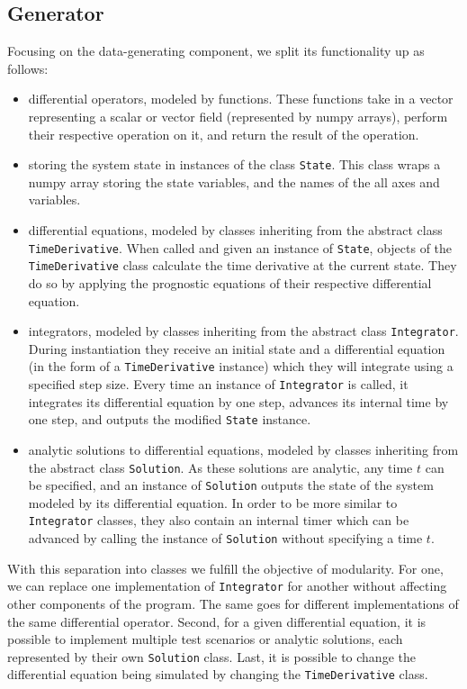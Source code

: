 \subsection*{Generator}
Focusing on the data-generating component, we split its functionality up as follows:
\begin{itemize}
\item differential operators, modeled by functions. 
These functions take in a vector representing a scalar or vector field (represented by numpy arrays), perform their respective operation on it, and return the result of the operation.
\item storing the system state in instances of the class \texttt{State}.
This class wraps a numpy array storing the state variables, and the names of the all axes and variables.
\item differential equations, modeled by classes inheriting from the abstract class \texttt{TimeDerivative}.
When called and given an instance of \texttt{State}, objects of the \texttt{TimeDerivative} class calculate the time derivative at the current state.
They do so by applying the prognostic equations of their respective differential equation.
\item integrators, modeled by classes inheriting from the abstract class \texttt{Integrator}.
During instantiation they receive an initial state and a differential equation (in the form of a \texttt{TimeDerivative} instance) which they will integrate using a specified step size.
Every time an instance of \texttt{Integrator} is called, it integrates its differential equation by one step, advances its internal time by one step, and outputs the modified \texttt{State} instance.
\item analytic solutions to differential equations, modeled by classes inheriting from the abstract class \texttt{Solution}.
As these solutions are analytic, any time $t$ can be specified, and an instance of \texttt{Solution} outputs the state of the system modeled by its differential equation.
In order to be more similar to \texttt{Integrator} classes, they also contain an internal timer which can be advanced by calling the instance of \texttt{Solution} without specifying a time $t$.
\end{itemize}
With this separation into classes we fulfill the objective of modularity.
For one, we can replace one implementation of \texttt{Integrator} for another without affecting other components of the program.
The same goes for different implementations of the same differential operator.
Second, for a given differential equation, it is possible to implement multiple test scenarios or analytic solutions, each represented by their own \texttt{Solution} class.
Last, it is possible to change the differential equation being simulated by changing the \texttt{TimeDerivative} class.

